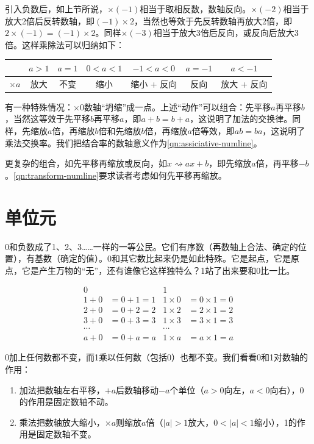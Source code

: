 \documentclass[b5paper]{ctexart}
\begin{document}
引入负数后，如上节所说，$\times (-1)$相当于取相反数，数轴反向。$\times (-2)$相当于放大2倍后反转数轴，即$(-1) \times 2$，当然也等效于先反转数轴再放大2倍，即$2 \times (-1) = (-1) \times 2$。同样$\times (-3)$相当于放大3倍后反向，或反向后放大3倍。这样乘除法可以归纳如下：

\begin{center}
  \begin{tabular}{c|c|c|c|c|c|c}
             & $a > 1$ & $a = 1$ & $0 < a < 1$  & $-1 < a < 0$ & $a = -1$ & $a < -1$ \\
  \hline
  $\times a$ & 放大     & 不变    & 缩小          & 缩小 + 反向 & 反向 & 放大 + 反向
  \end{tabular}
\end{center}

有一种特殊情况：$\times 0$数轴“坍缩”成一点。上述“动作”可以组合：先平移$a$再平移$b$，当然这等效于先平移$b$再平移$a$，即$a + b = b + a$，这说明了加法的交换律。同样，先缩放$a$倍，再缩放$b$倍和先缩放$b$倍，再缩放$a$倍等效，即$ab = ba$，这说明了乘法交换率。我们把结合率的数轴意义作为\cref{qn:assiciative-numline}。

更复杂的组合，如先平移再缩放或反向，如$x \rightsquigarrow ax + b$，即先缩放$a$倍，再平移$-b$。\cref{qn:transform-numline}要求读者考虑如何先平移再缩放。

\section{单位元}
 \label{sec:unit}
0和负数成了1、2、3……一样的一等公民。它们有序数（再数轴上合法、确定的位置），有基数（确定的值）。0和其它数比起来仍是如此特殊。它是起点，它是原点，它是产生万物的“无”，还有谁像它这样独特么？1站了出来要和0比一比。

\begin{align*}
  0     &             &  1 & \\
  1 + 0 & = 0 + 1 = 1  &  1 \times 0 &= 0 \times 1 = 0 \\
  2 + 0 &= 0 + 2 = 2  &  1 \times 2  &= 2 \times 1 = 2 \\
  3 + 0 &= 0 + 3 = 3  &  1 \times 3  &= 3 \times 1 = 3 \\
  \cdots &            & \cdots & \\
  a + 0 &= 0 + a = a  &  1 \times a  &= a \times 1 =  a
\end{align*}

0加上任何数都不变，而1乘以任何数（包括0）也都不变。我们看看0和1对数轴的作用：
\begin{enumerate}[1)]
\item 加法把数轴左右平移，$+a$后数轴移动$-a$个单位（$a > 0$向左，$a < 0$向右），0的作用是固定数轴不动。
\item 乘法把数轴放大缩小，$\times a$则缩放$a$倍（$|a| > 1$放大，$0 < |a| < 1$缩小），1的作用是固定数轴不变。
\end{enumerate}
\end{document}
